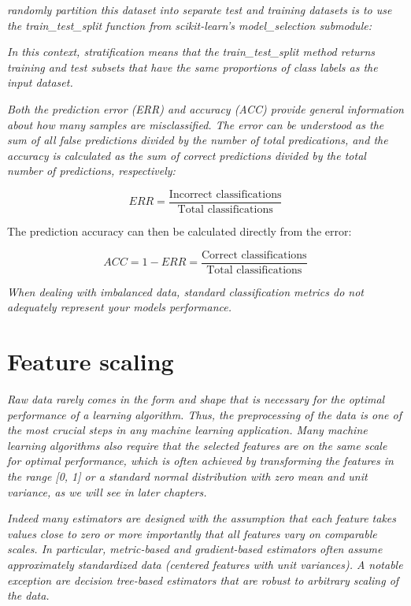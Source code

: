 \textit{randomly partition this dataset into separate test and training datasets is to use the train_test_split function from scikit-learn's model_selection submodule:}

\textit{In this context, stratification means that the train\_test\_split method returns training and test subsets that have the same proportions of class labels as the input dataset.}

\textit{Both the prediction error (ERR) and accuracy (ACC) provide general information about how many samples are misclassified. The error can be understood as the sum of all false predictions divided by the number of total predications, and the accuracy is calculated as the sum of correct predictions divided by the total number of predictions, respectively:}

\begin{equation} \label{eq:prediction_error}
    ERR = \frac{\text{Incorrect classifications}} {\text{Total classifications}}
\end{equation}

The prediction accuracy can then be calculated directly from the error:

\begin{equation} \label{eq:prediction_accuracy}
    ACC = 1 - ERR = \frac{\text{Correct classifications}} {\text{Total classifications}}
\end{equation}

\textit{When dealing with imbalanced data, standard classification metrics do not adequately represent your models performance.}

\section{Feature scaling} \label{sec:feature_scaling}

\textit{Raw data rarely comes in the form and shape that is necessary for the optimal performance of a learning algorithm. Thus, the preprocessing of the data is one of the most crucial steps in any machine learning application. Many machine learning algorithms also require that the selected features are on the same scale for optimal performance, which is often achieved by transforming the features in the range [0, 1] or a standard normal distribution with zero mean and unit variance, as we will see in later chapters.}

\textit{Indeed many estimators are designed with the assumption that each feature takes values close to zero or more importantly that all features vary on comparable scales. In particular, metric-based and gradient-based estimators often assume approximately standardized data (centered features with unit variances). A notable exception are decision tree-based estimators that are robust to arbitrary scaling of the data.}\cite{Scikit-learndevelopers2019b}

